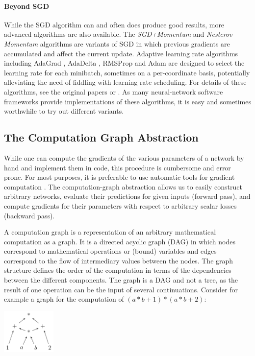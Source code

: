 \documentclass[jair,twoside,11pt,theapa]{article}
\begin{document}
{\paragraph{Beyond SGD} While the SGD algorithm can and often does
produce good results, more advanced algorithms are also available.
The \emph{SGD+Momentum} \cite{polyak1964methods} and \emph{Nesterov Momentum} \cite{sutskever2013importance}
algorithms are variants of SGD in which previous gradients are accumulated and
affect the current update.  Adaptive learning rate algorithms including AdaGrad
\cite{duchi2011adaptive}, AdaDelta \cite{zeiler2012adadelta}, RMSProp
\cite{tieleman2012lecture} and Adam \cite{kingma2014adam} are designed
to select the learning rate for each minibatch, sometimes on a per-coordinate
basis, potentially alleviating the need of fiddling with learning rate
scheduling.  For details of these algorithms, see the original papers or
\cite[Sections 8.3, 8.4]{bengio2015deep}.  As many neural-network software
frameworks provide implementations of these algorithms, it is easy and sometimes
worthwhile to try out different variants.

\subsection{The Computation Graph Abstraction}

While one can compute the gradients of the various parameters of a network by
hand and implement them in code, this procedure is cumbersome and error prone.
For most purposes, it is preferable to use automatic tools for gradient
computation \cite{bengio2012practical}. The computation-graph abstraction allows
us to easily construct arbitrary networks, evaluate their predictions for given
inputs (forward pass), and compute gradients for their parameters with respect
to arbitrary scalar losses (backward pass).

A computation graph is a representation of an arbitrary mathematical computation as
a graph. It is a directed acyclic graph (DAG) in which nodes correspond to
mathematical operations or (bound) variables and edges correspond to the flow of
intermediary values between the nodes. The graph structure defines the order of
the computation in terms of the dependencies between the different components.
The graph is a DAG and not a tree, as the result of one operation can be the
input of several continuations. Consider for example a 
graph for the computation of $(a*b+1)*(a*b+2)$:
\begin{center}
\includegraphics[width=0.2\textwidth]{ab1ab2.pdf}
\end{center}

}
\end{document}
